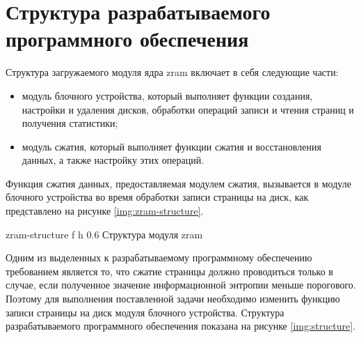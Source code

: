 \section{Структура разрабатываемого программного обеспечения}

Структура загружаемого модуля ядра zram включает в себя следующие части:
\begin{itemize}
	\item модуль блочного устройства, который выполняет функции создания, настройки и удаления дисков, обработки операций записи и чтения страниц и получения статистики;
	\item модуль сжатия, который выполняет функции сжатия и восстановления данных, а также настройку этих операций.
\end{itemize}

Функция сжатия данных, предоставляемая модулем сжатия, вызывается в модуле блочного устройства во время обработки записи страницы на диск, как представлено на рисунке \ref{img:zram-structure}.

    {zram-structure}
    {f}
    {h}
    {0.6\textwidth}
    {Структура модуля zram}

Одним из выделенных к разрабатываемому программному обеспечению требованием является то, что сжатие страницы должно проводиться только в случае, если полученное значение информационной энтропии меньше порогового. Поэтому для выполнения поставленной задачи необходимо изменить функцию записи страницы на диск модуля блочного устройства. Структура разрабатываемого программного обеспечения показана на рисунке \ref{img:structure}.

